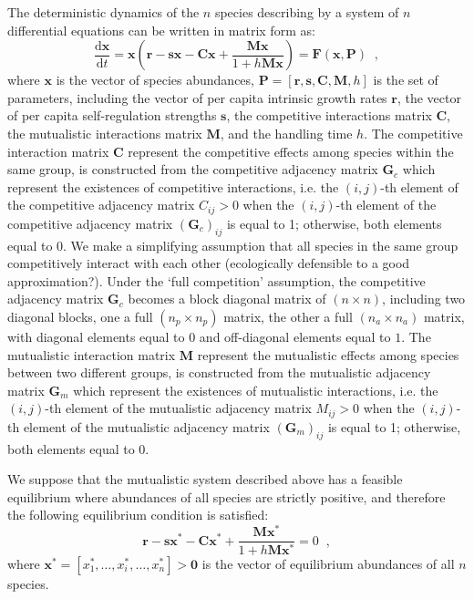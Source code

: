 \documentclass[a4paper,fleqn,12pt]{article}
\begin{document}
The deterministic dynamics of the $n$ species describing by a system of $n$ differential equations can be written in matrix form as:
\begin{equation} \label{eq:dynamic-mutual-matrix-form}
\frac{\mathrm{d}\mathbf{x}}{\mathrm{d}t} = \mathbf{x} \left( \mathbf{r} - \mathbf{s} \mathbf{x} - \mathbf{C} \mathbf{x} + \frac{ \mathbf{M} \mathbf{x}}{1 + h \mathbf{M} \mathbf{x}} \right) = \mathbf{F}(\mathbf{x}, \mathbf{P}) \;\; ,
\end{equation}
where 
$\mathbf{x}$ is the vector of species abundances,
$\mathbf{P} = [\mathbf{r}, \mathbf{s}, \mathbf{C}, \mathbf{M}, h]$ is the set of parameters, including 
the vector of per capita intrinsic growth rates $\mathbf{r}$,
the vector of per capita self-regulation strengths $\mathbf{s}$,
the competitive interactions matrix $\mathbf{C}$,
the mutualistic interactions matrix $\mathbf{M}$,
and the handling time $h$. 
The competitive interaction matrix $\mathbf{C}$ represent the competitive effects among species within the same group, is constructed from the competitive adjacency matrix $\mathbf{G}_c$ which represent the existences of competitive interactions,
i.e. the $(i,j)$-th element of the competitive adjacency matrix $C_{ij} > 0$ when the $(i,j)$-th element of the competitive adjacency matrix $(\mathbf{G}_c)_{ij}$ is equal to 1; otherwise, both elements equal to 0.
We make a simplifying assumption that all species in the same group competitively interact with each other (ecologically defensible to a good approximation?). 
Under the `full competition' assumption, the competitive adjacency matrix $\mathbf{G}_c$ becomes a block diagonal matrix of $(n \times n)$, including two diagonal blocks,
one a full $(n_p \times n_p)$ matrix, the other a full $(n_a \times n_a)$ matrix, with diagonal elements equal to $0$ and off-diagonal elements equal to $1$.
The mutualistic interaction matrix $\mathbf{M}$ represent the mutualistic effects among species between two different groups, is constructed from the mutualistic adjacency matrix $\mathbf{G}_m$ which represent the existences of mutualistic interactions,
i.e. the $(i,j)$-th element of the mutualistic adjacency matrix $M_{ij} > 0$ when the $(i,j)$-th element of the mutualistic adjacency matrix $(\mathbf{G}_m)_{ij}$ is equal to 1; otherwise, both elements equal to 0.

We suppose that the mutualistic system described above has a feasible equilibrium where abundances of all species are strictly positive, and therefore the following equilibrium condition is satisfied:
\begin{equation} \label{eq:equilibrium-condition}
 \mathbf{r} - \mathbf{s} \mathbf{x}^* - \mathbf{C} \mathbf{x}^* + \frac{ \mathbf{M} \mathbf{x}^*}{1 + h \mathbf{M} \mathbf{x}^*} = 0 \;\;,
\end{equation}
where $\mathbf{x}^*=[x_1^*, \ldots, x_i^*, \ldots, x_n^*] > \mathbf{0}$ is the vector of equilibrium abundances of all $n$ species.
\end{document}
